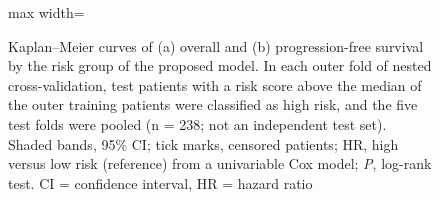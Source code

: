 \documentclass{article}
\providecommand{\kmsmall}{\fontfamily{ptm}\fontsize{7}{8.4}\selectfont}
\begin{document}
\begin{figure}[htbp]
\begin{adjustbox}{max width=\textwidth}
\end{adjustbox}
\caption{Kaplan--Meier curves of (a) overall and (b) progression-free survival by the risk group of the proposed model. In each outer fold of nested cross-validation, test patients with a risk score above the median of the outer training patients were classified as high risk, and the five test folds were pooled (n = 238; not an independent test set). Shaded bands, 95\% CI; tick marks, censored patients; HR, high versus low risk (reference) from a univariable Cox model; \textit{P}, log-rank test. CI = confidence interval, HR = hazard ratio}
\label{fig:km_overall}
\end{figure}
\end{document}
